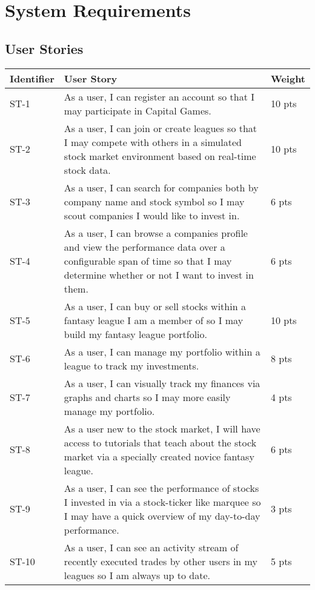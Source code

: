 \chapter{System Requirements}

\section{User Stories}

\renewcommand\arraystretch{2}
\begin{longtable}{|p{0.6in}|p{4.6in}|p{0.5in}|}
\hline
{\large \color{color1}Identifier}&{\large \color{color1}User Story}&{\large \color{color1}Weight} \\ \hline
ST-1&As a user, I can register an account so that I may participate in Capital Games.&10 pts \\ \hline 
ST-2&As a user, I can join or create leagues so that I may compete with others in a simulated stock market environment based on real-time stock data.&10 pts \\ \hline 
ST-3&As a user, I can search for companies both by company name and stock symbol so I may scout companies I would like to invest in.&6 pts  \\ \hline 
ST-4&As a user, I can browse a companies profile and view the performance data over a configurable span of time so that I may determine whether or not I want to invest in them.&6 pts  \\ \hline 
ST-5&As a user, I can buy or sell stocks within a fantasy league I am a member of so I may build my fantasy league portfolio.&10 pts \\ \hline 
ST-6&As a user, I can manage my portfolio within a league to track my investments.&8 pts  \\ \hline 
ST-7&As a user, I can visually track my finances via graphs and charts so I may more easily manage my portfolio.&4 pts  \\ \hline 
ST-8&As a user new to the stock market, I will have access to tutorials that teach about the stock market via a specially created novice fantasy league.&6 pts  \\ \hline 
ST-9&As a user, I can see the performance of stocks I invested in via a stock-ticker like marquee so I may have a quick overview of my day-to-day performance.&3 pts  \\ \hline 
ST-10&As a user, I can see an activity stream of recently executed trades by other users in my leagues so I am always up to date.&5 pts  \\ \hline 

\end{longtable}
